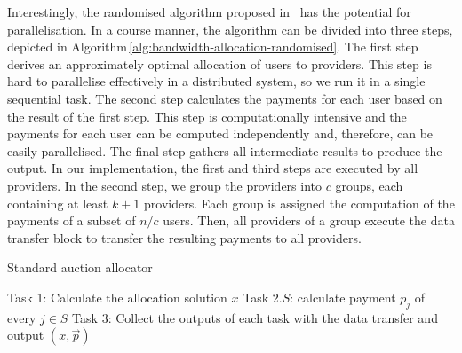 Interestingly, the randomised algorithm proposed
in~\cite{Zhang2015Truthful} has the potential for parallelisation.
In a course manner, the algorithm can be divided into three steps, depicted
in Algorithm\,\ref{alg:bandwidth-allocation-randomised}. The first
step derives an approximately optimal allocation of users to providers.
This step is hard to parallelise effectively in a distributed system,
so we run it in a single sequential task.
The second step calculates the payments for each user based on the result of the first step.
This step is computationally intensive and the payments for each user can be computed
independently and, therefore, can be easily parallelised.
The final step gathers all intermediate results to produce the output.
In our implementation, the first and third steps are executed by all providers.
In the second step, we group the providers into $c$ groups, each containing at least $k+1$
providers. Each group is assigned the computation of the payments
of a subset of $n/c$ users. Then, all providers of a group
execute the data transfer block to transfer the resulting payments to all providers.

\begin{algorithm}[tbp]
	\caption{Standard auction allocator}
	\label{alg:bandwidth-allocation-randomised}
	\small

	\begin{algorithmic}[1]
		\State Task 1: Calculate the allocation solution $x$
			\State Task 2.$S$: calculate payment $p_j$ of every $j \in S$
		\EndFor
		\State Task 3: Collect the outputs of each task with the data transfer and output $(x,\vec{p})$
	\end{algorithmic}

\end{algorithm}

